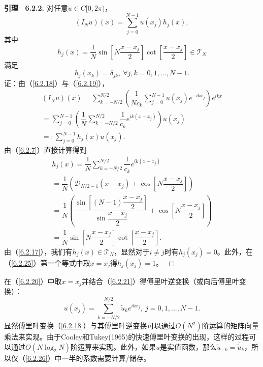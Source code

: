 \textbf{引理 \  6.2.2.}  对任意$u \in C[0,2\pi)$，
\begin{equation}
    (I_N u)(x) = \sum_{j =0}^{N-1} u(x_j)h_j(x),
    \label{6.2.22}
\end{equation}        
    其中    
\begin{equation}
    h_j(x) = \dfrac{1}{N} \sin \left[ N\dfrac{x - x_j}{2}\right] \cot \left[ \dfrac{x - x_j}{2}\right] \in \mathcal{T}_N 
    \label{6.2.23}
\end{equation}        
    满足    
\begin{equation}
    h_j(x_k) = \delta_{jk}, \   \forall j,k = 0,1,...,N-1.
    \label{6.2.24}
\end{equation}       
    证：由（\ref{6.2.18}）与（\ref{6.2.19}），   
\begin{equation*}
    \begin{gathered}
        (I_N u)(x) = \sum_{k = -N/2}^{N/2} \left( \dfrac{1}{Nc_k} \sum_{j = 0}^{N-1} u(x_j)e^{-ikx_j}\right)e^{ikx} \\
        = \sum_{j = 0}^{N-1} \left( \dfrac{1}{N} \sum_{k = -N/2}^{N/2} \dfrac{1}{c_k} e^{ik(x - x_j)} \right)u(x_j)  \\
        =: \sum_{j = 0}^{N-1} h_j(x)u(x_j).
    \end{gathered}
\end{equation*}        
    由（\ref{6.2.7}）直接计算得到   
\begin{equation}
    \begin{gathered}
        h_j(x) = \dfrac{1}{N} \sum_{k = -N/2}^{N/2} \dfrac{1}{c_k} e^{ik(x - x_j)}  \\
        = \dfrac{1}{N} \left(\mathcal{D}_{N/2-1} (x - x_j) + \cos\left[N\dfrac{x - x_j}{2} \right] \right) \\
        = \dfrac{1}{N} \left( \dfrac{\sin \left[(N - 1)\dfrac{x - x_j }{2} \right]}{\sin \dfrac{x - x_j}{2}} + \cos \left[N\dfrac{x- x_j}{2}\right]\right)  \\
        = \dfrac{1}{N} \sin \left[ N\dfrac{x- x_j}{2}\right] \cot \left[\dfrac{x - x_j}{2}\right].
    \end{gathered}
    \label{6.2.25}
\end{equation}        
    由（\ref{6.2.17}），我们有$h_j(x) \in \mathcal{T}_N$，显然对于$i \neq j$时有$h_j(x_j) = 0$。此外，在（\ref{6.2.25}）第一个等式中取$x = x_j$得$h_j(x_j) = 1$。
    $\  \Box$
    
    在（\ref{6.2.20}）中取$x = x_j$并结合（\ref{6.2.21}）得傅里叶逆变换（或向后傅里叶变换）：    
\begin{equation}
    u(x_j) = \sum_{k = -N/2}^{N/2} \widetilde{u}_k e^{ikx_j}, \  j = 0,1,...,N-1.
    \label{6.2.26}
\end{equation}
    显然傅里叶变换（\ref{6.2.18}）与其傅里叶逆变换可以通过$O(N^2)$阶运算的矩阵向量乘法来实现。由于Cooley和Tukey(1965)的快速傅里叶变换的出现，这样的过程可以通过$O(N\log_2N)$阶运算来实现。此外，如果$u$是实值函数，那么$\widetilde{u}_{-k} = \bar{\widetilde{u}}_k$，所以仅（\ref{6.2.26}）中一半的系数需要计算/储存。
    
